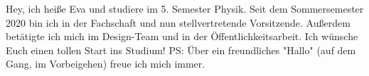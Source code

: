 \begin{multicols}{2}
\vspace{-1.1cm}

{
Hey, ich heiße Eva und studiere im 5. Semester Physik. Seit dem Sommersemester 2020 bin ich in der Fachschaft und nun stellvertretende Vorsitzende. Außerdem betätigte ich mich im Design-Team und in der Öffentlichkeitsarbeit. 
Ich wünsche Euch einen tollen Start ins Studium! PS: Über ein freundliches "Hallo" (auf dem Gang, im Vorbeigehen) freue ich mich immer.
} 

\vspace{-1.1cm}


\end{multicols}
